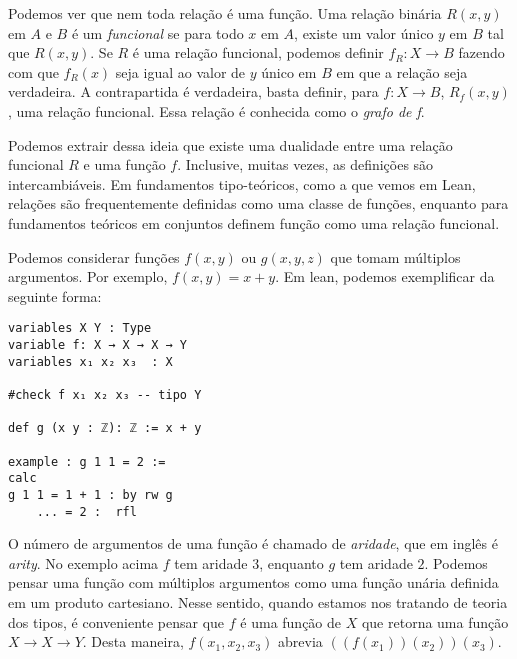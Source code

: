 Podemos ver que nem toda relação é uma função. Uma relação binária $R(x,y)$ em
$A$ e $B$ é um \textit{funcional} se para todo $x$ em $A$, existe um valor
único $y$ em $B$ tal que $R(x,y)$. Se $R$ é uma relação funcional, podemos
definir $f_R: X \to B$ fazendo com que $f_R(x)$ seja igual ao valor de $y$
único em $B$ em que a relação seja verdadeira. A contrapartida é verdadeira,
basta definir, para $f: X \to B$, $R_f(x,y)$, uma relação funcional. Essa
relação é conhecida como o \textit{grafo de f}. 

Podemos extrair dessa ideia que existe uma dualidade entre uma relação
funcional $R$ e uma função $f$. Inclusive, muitas vezes, as definições são
intercambiáveis. Em fundamentos tipo-teóricos, como a que vemos em Lean,
relações são frequentemente definidas como uma classe de funções, enquanto
para fundamentos teóricos em conjuntos definem função como uma relação
funcional. 

Podemos considerar funções $f(x,y)$ ou $g(x,y,z)$ que tomam múltiplos
argumentos. Por exemplo, $f(x,y) = x + y$. Em lean, podemos exemplificar da
seguinte forma: 

\begin{lstlisting}
variables X Y : Type 
variable f: X → X → X → Y 
variables x₁ x₂ x₃  : X

#check f x₁ x₂ x₃ -- tipo Y

def g (x y : ℤ): ℤ := x + y

example : g 1 1 = 2 := 
calc 
g 1 1 = 1 + 1 : by rw g 
    ... = 2 :  rfl
\end{lstlisting}

O número de argumentos de uma função é chamado de \textit{aridade}, que em
inglês é \textit{arity}. No exemplo acima $f$ tem aridade $3$, enquanto $g$
tem aridade $2$. Podemos pensar uma função com múltiplos argumentos como uma
função unária definida em um produto cartesiano. Nesse sentido, quando estamos
nos tratando de teoria dos tipos, é conveniente pensar que $f$ é uma função de
$X$ que retorna uma função $X \to X \to Y$. Desta maneira, $f(x_1, x_2, x_3)$
abrevia $((f(x_1))(x_2))(x_3)$.

